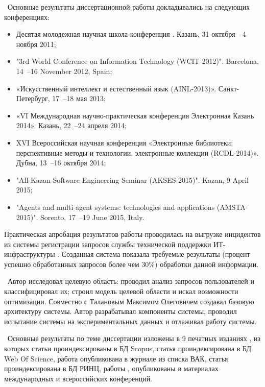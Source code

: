 \probation\
 Основные результаты диссертационной работы докладывались на следующих конференциях:
\begin{itemize}
	\item Десятая молодежная научная школа-конференция . Казань, 31 октября~--4 ноября 2011;
	\item "3rd World Conference on Information Technology (WCIT-2012)". Barcelona, 14~--16 November 2012, Spain; 
	\item «Искусственный интеллект и естественный язык (AINL-2013)». Санкт-Петербург, 17~--18 мая 2013;
	\item «VI Международная научно-практическая конференция Электронная Казань 2014». Казань, 22~--24 апреля 2014;
	\item XVI Всероссийская научная конференция «Электронные библиотеки: перспективные методы и технологии, электронные коллекции (RCDL-2014)». Дубна, 13~--16 октября 2014;
	\item "All-Kazan Software Engineering Seminar (AKSES-2015)". Kazan, 9 April 2015;
	\item "Agents and multi-agent systems: technologies and applications (AMSTA-2015)". Sorento, 17~--19 June 2015, Italy.
\end{itemize} \par
Практическая апробация результатов работы проводилась на выгрузке инцидентов из системы регистрации запросов службы технической поддержки ИТ-инфраструктуры \icl. Созданная система показала требуемые результаты (процент успешно обработанных запросов более чем 30\%) обработки данной информации. \par
\contribution\ Автор исследовал целевую область: проводил анализ запросов пользователей и классифицировал их; строил модель целевой области и искал возможности оптимизации. Совместно с Талановым Максимом Олеговичем создавал базовую архитектуру системы. Автор разрабатывал компоненты системы, проводил испытание системы на экспериментальных данных и отлаживал работу системы. \par
\publications\ Основные результаты по теме диссертации изложены в 9 печатных изданиях  \cite{Lobachevskii, WCIT-2012, AINL-2013, ISGZ, IJSE-1, IJSE-2, RCDL-2014, AMSTA-2015, VAK-1}, из которых статьи \cite{RCDL-2014, AMSTA-2015} проиндексированы в БД Scopus, статья \cite{AMSTA-2015} проиндексирована в БД Web Of Science, работа \cite{VAK-1} опубликована в журнале из списка ВАК, статья  \cite{ISGZ} проиндексирована в БД РИНЦ, работы \cite{Lobachevskii},\cite{WCIT-2012, AINL-2013, ISGZ} опубликованы в материалах международных и всероссийских конференций.



